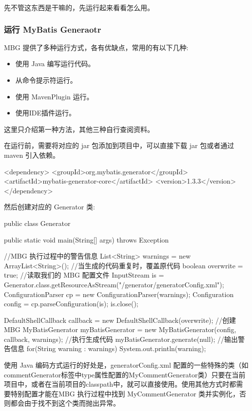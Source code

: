 先不管这东西是干嘛的，先运行起来看看怎么用。

\subsubsection{运行 MyBatis Generaotr}

MBG 提供了多种运行方式，各有优缺点，常用的有以下几种:
\begin{itemize}
    \item 使用 Java 编写运行代码。
    \item 从命令提示符运行。
    \item 使用 MavenPlugin 运行。
    \item 使用IDE插件运行。
\end{itemize}

这里只介绍第一种方法，其他三种自行查阅资料。

在运行前，需要将对应的 jar 包添加到项目中，可以直接下载 jar 包或者通过 maven 引入依赖。

\begin{xml}
<dependency>
    <groupId>org.mybatis.generator</groupId>
    <artifactId>mybatis-generator-core</artifactId>
    <version>1.3.3</version>
</dependency>
\end{xml}

然后创建对应的 Generator 类:

\begin{Java}
public class Generator {
    public static void main(String[] args) throws Exception {
        //MBG 执行过程中的警告信息
        List<String> warnings = new ArrayList<String>();
        //当生成的代码重复时，覆盖原代码
        boolean overwrite = true;
        //读取我们的 MBG 配置文件
        InputStream is = Generator.class.getResourceAsStream("/generator/generatorConfig.xml");
        ConfigurationParser cp = new ConfigurationParser(warnings);
        Configuration config = cp.parseConfiguration(is);
        is.close();

        DefaultShellCallback callback = new DefaultShellCallback(overwrite);
        //创建 MBG
        MyBatisGenerator myBatisGenerator = new MyBatisGenerator(config, callback, warnings);
        //执行生成代码
        myBatisGenerator.generate(null);
        //输出警告信息
        for(String warning : warnings){
            System.out.println(warning);
        }
    }
}
\end{Java}

使用 Java 编码方式运行的好处是，generatorConfig.xml 配置的一些特殊的类（如commentGenerator标签中type属性配置的MyCommentGenerator类）只要在当前项目中，或者在当前项目的classpath中，就可以直接使用。使用其他方式时都需要特别配置才能在MBG 执行过程中找到 MyCommentGenerator 类并实例化，否则都会由于找不到这个类而抛出异常。

